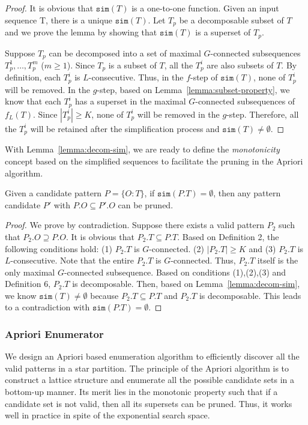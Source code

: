 \begin{proof}
It is obvious that $\mathtt{sim}(T)$ is a one-to-one function. Given an input sequence T, there is a unique  $\mathtt{sim}(T)$. Let $T_p$ be a decomposable subset of $T$ and we prove the lemma by showing that $\mathtt{sim}(T)$ is a superset of $T_p$.

Suppose $T_p$ can be decomposed into a set of maximal $G$-connected
subsequences $T_p^1, \ldots, T_p^m$ ($m \geq 1$). Since $T_p$ is a subset of $T$, all the $T_p^i$ are also subsets of $T$. By definition, each $T_p^i$ is $L$-consecutive. Thus, in the $f$-step of $\mathtt{sim}(T)$, none of $T_p^i$ will be removed. In the $g$-step, based on Lemma~\ref{lemma:subset-property}, we know that each $T_p^i$ has a superset in the maximal $G$-connected subsequences of $f_L(T)$. Since $|T_p^i|\geq K$, none of $T_p^i$ will be removed in the $g$-step. Therefore, all the $T_p^i$ will be retained after the simplification process and $\mathtt{sim}(T) \neq \emptyset$.
\end{proof}

With Lemma~\ref{lemma:decom-sim}, we are ready to define the \emph{monotonicity} concept based on the simplified
sequences to facilitate the pruning in the Apriori algorithm. 

\begin{theorem}[Monotonicity]\label{THM:SPARE_MONO}
Given a candidate pattern $P=\{O:T\}$, if $\mathtt{sim}(P.T)=\emptyset$, then any pattern candidate $P'$ with $P.O \subseteq P'.O$ can be pruned.
\end{theorem}

\begin{proof}
We prove by contradiction. Suppose there exists a valid pattern $P_2$ such that $P_2.O \supseteq P.O$. It is obvious that $P_2.T \subseteq P.T$. Based on Definition 2, the following conditions hold: (1) $P_2.T$ is $G$-connected. (2) $|P_2.T| \geq K$ and (3) $P_2.T$ is $L$-consecutive. Note that the entire $P_2.T$ is $G$-connected. Thus, $P_2.T$ itself is the only maximal $G$-connected subsequence. Based on conditions (1),(2),(3) and Definition 6, $P_2.T$ is decomposable. Then, based on Lemma~\ref{lemma:decom-sim}, we know $\mathtt{sim}(T)\neq \emptyset$ because $P_2.T \subseteq P.T$ and $P_2.T$ is decomposable. This leads to a contradiction with $\mathtt{sim}(P.T)=\emptyset$.
\end{proof}

\subsubsection{Apriori Enumerator}
We design an Apriori based enumeration algorithm to efficiently discover all the valid patterns in a star partition. The principle of the Apriori algorithm is to construct a lattice structure and enumerate all the possible candidate sets in a bottom-up manner. Its merit lies in the monotonic property such that if a candidate set is not valid, then all its supersets can be pruned. Thus, it works well in practice in spite of the exponential search space.

